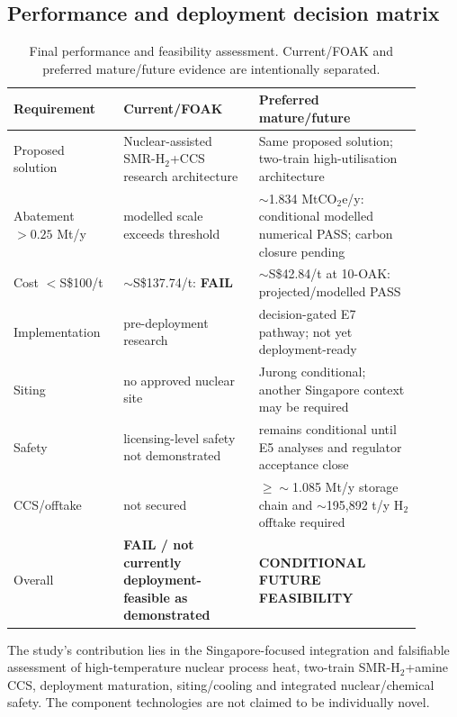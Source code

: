 \subsection{Performance and deployment decision matrix}
\begin{table}[htbp]\centering\small
\caption{Final performance and feasibility assessment. Current/FOAK and preferred mature/future evidence are intentionally separated.}
\label{tab:cn4252-final}
\begin{tabular}{p{0.24\linewidth}p{0.30\linewidth}p{0.36\linewidth}}
\toprule
Requirement & Current/FOAK & Preferred mature/future \\ \midrule
Proposed solution & Nuclear-assisted SMR-H$_2$+CCS research architecture & Same proposed solution; two-train high-utilisation architecture \\
Abatement $>0.25$ Mt/y & modelled scale exceeds threshold & $\sim$1.834 MtCO$_2$e/y: conditional modelled numerical PASS; carbon closure pending \\
Cost $<$S\$100/t & $\sim$S\$137.74/t: \textbf{FAIL} & $\sim$S\$42.84/t at 10-OAK: projected/modelled PASS \\
Implementation & pre-deployment research & decision-gated E7 pathway; not yet deployment-ready \\
Siting & no approved nuclear site & Jurong conditional; another Singapore context may be required \\
Safety & licensing-level safety not demonstrated & remains conditional until E5 analyses and regulator acceptance close \\
CCS/offtake & not secured & $\geq\sim$1.085 Mt/y storage chain and $\sim$195,892 t/y H$_2$ offtake required \\
Overall & \textbf{FAIL / not currently deployment-feasible as demonstrated} & \textbf{CONDITIONAL FUTURE FEASIBILITY} \\
\bottomrule
\end{tabular}
\end{table}

The study's contribution lies in the Singapore-focused integration and falsifiable assessment of high-temperature nuclear process heat, two-train SMR-H$_2$+amine CCS, deployment maturation, siting/cooling and integrated nuclear/chemical safety. The component technologies are not claimed to be individually novel.
